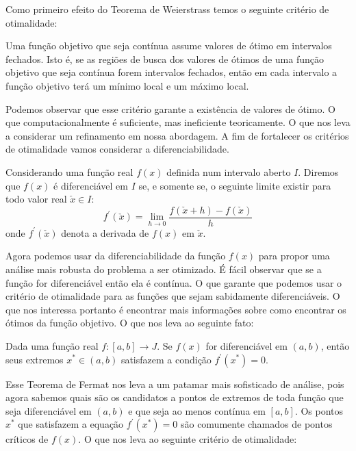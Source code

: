 \par Como primeiro efeito do Teorema de Weierstrass temos o seguinte critério de otimalidade:

\begin{theorem}
  Uma função objetivo que seja contínua assume valores de ótimo em intervalos fechados. Isto é, se as regiões de busca dos valores de ótimos de uma função objetivo que seja contínua forem intervalos fechados, então em cada intervalo a função objetivo terá um mínimo local e um máximo local. 
\end{theorem}


\par Podemos observar que esse critério garante a existência de valores de ótimo. O que computacionalmente é suficiente, mas ineficiente teoricamente. O que nos leva a considerar um refinamento em nossa abordagem. A fim de fortalecer os critérios de otimalidade vamos considerar a diferenciabilidade. 

\begin{definition}
  Considerando uma função real $f(x)$ definida num intervalo aberto $I$. Diremos que $f(x)$ é diferenciável em $I$ se, e somente se, o seguinte limite existir para todo valor real $\check{x} \in I$:
  \begin{equation}
    f^{'}(\check{x})= \lim_{h \rightarrow 0}\frac{f(\check{x}+h)- f(\check{x})}{h}
  \end{equation}
  onde $f^{'}(\check{x})$ denota a derivada de $f(x)$ em $\check{x}$.
\end{definition}

\par Agora podemos usar da diferenciabilidade da função $f(x)$ para propor uma análise mais robusta do problema a ser otimizado. É fácil observar que se a função for diferenciável então ela é contínua. O que garante que podemos usar o critério de otimalidade para as funções que sejam sabidamente diferenciáveis. O que nos interessa portanto é encontrar mais informações sobre como encontrar os ótimos da função objetivo. O que nos leva ao seguinte fato:

\begin{theorem}
  Dada uma função real $f:[a,b] \rightarrow J$. Se $f(x)$ for diferenciável em $(a,b)$, então seus extremos $x^{*} \in (a,b)$ satisfazem a condição $f^{'}(x^*) = 0$. 
\end{theorem}

\par Esse Teorema de Fermat nos leva a um patamar mais sofisticado de análise, pois agora sabemos quais são os candidatos a pontos de extremos de toda função que seja diferenciável em $(a,b)$ e que seja ao menos contínua em $[a,b]$. Os pontos $x^{*}$ que satisfazem a equação $f^{'}(x^*) = 0$ são comumente chamados de pontos críticos de $f(x)$. O que nos leva ao seguinte critério de otimalidade:

